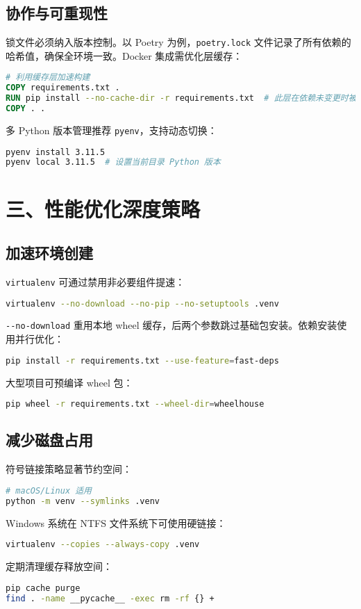 \section{协作与可重现性}
锁文件必须纳入版本控制。以 Poetry 为例，\verb!poetry.lock! 文件记录了所有依赖的哈希值，确保全环境一致。Docker 集成需优化层缓存：\par
\begin{lstlisting}[language=dockerfile]
# 利用缓存层加速构建
COPY requirements.txt .
RUN pip install --no-cache-dir -r requirements.txt  # 此层在依赖未变更时被复用
COPY . .
\end{lstlisting}
多 Python 版本管理推荐 \verb!pyenv!，支持动态切换：\par
\begin{lstlisting}[language=bash]
pyenv install 3.11.5
pyenv local 3.11.5  # 设置当前目录 Python 版本
\end{lstlisting}
\chapter{三、性能优化深度策略}
\section{加速环境创建}
\verb!virtualenv! 可通过禁用非必要组件提速：\par
\begin{lstlisting}[language=bash]
virtualenv --no-download --no-pip --no-setuptools .venv
\end{lstlisting}
\verb!--no-download! 重用本地 wheel 缓存，后两个参数跳过基础包安装。依赖安装使用并行优化：\par
\begin{lstlisting}[language=bash]
pip install -r requirements.txt --use-feature=fast-deps
\end{lstlisting}
大型项目可预编译 wheel 包：\par
\begin{lstlisting}[language=bash]
pip wheel -r requirements.txt --wheel-dir=wheelhouse
\end{lstlisting}
\section{减少磁盘占用}
符号链接策略显著节约空间：\par
\begin{lstlisting}[language=bash]
# macOS/Linux 适用
python -m venv --symlinks .venv
\end{lstlisting}
Windows 系统在 NTFS 文件系统下可使用硬链接：\par
\begin{lstlisting}[language=bash]
virtualenv --copies --always-copy .venv
\end{lstlisting}
定期清理缓存释放空间：\par
\begin{lstlisting}[language=bash]
pip cache purge
find . -name __pycache__ -exec rm -rf {} +
\end{lstlisting}
